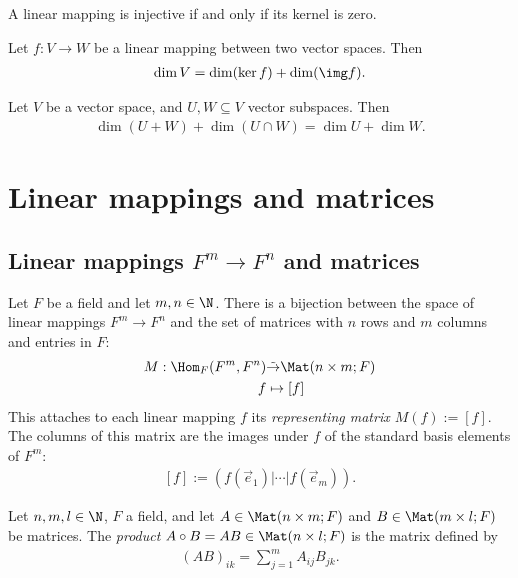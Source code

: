 \documentclass{article}
\begin{document}
\begin{lemma}[Lemma 1.8.2]
	A linear mapping is injective if and only if its kernel is zero.
\end{lemma}

\begin{theorem}
	Let $f:V\to W$ be a linear mapping between two vector spaces. Then
	\begin{align*}
		\dim V = \dim(\ker f) + \dim(\img f).
	\end{align*}
\end{theorem}

\begin{corollary}
	Let $V$ be a vector space, and $U,W\subseteq V$ vector subspaces. Then
	\begin{align*}
		\dim(U+W)+\dim(U\cap W) = \dim U + \dim W.
	\end{align*}
\end{corollary}

\section{Linear mappings and matrices}

\subsection{Linear mappings $F^m\to F^n$ and matrices}

\begin{theorem}[Theorem 2.1.1]
	Let $F$ be a field and let $m,n\in\N$. There is a bijection between the space of
	linear mappings $F^m\to F^n$ and the set of matrices with $n$ rows and $m$
	columns and entries in $F$:
	\begin{align*}
		M:\Hom_F(F^m,F^n) & \tilde\to\Mat(n\times m; F) \\
		f                 & \mapsto  \left[f\right]
	\end{align*}
	This attaches to each linear mapping $f$ its \emph{representing matrix
		$M(f):=\left[f\right]$}. The columns of this matrix are the images under $f$
	of the standard basis elements of $F^m$:
	\begin{align*}
		\left[f\right]:=(f(\vec e_1)|\cdots|f(\vec e_m)).
	\end{align*}
\end{theorem}

\begin{definition}
	Let $n,m,l\in\N$, $F$ a field, and let $A\in\Mat(n\times m; F)$ and
	$B\in\Mat(m\times l; F)$ be matrices. The \emph{product}
	$A\circ B=AB\in\Mat(n\times l; F)$ is the matrix defined by
	\begin{align*}
		(AB)_{ik} = \sum_{j=1}^m A_{ij}B_{jk}.
	\end{align*}
\end{definition}
\end{document}
